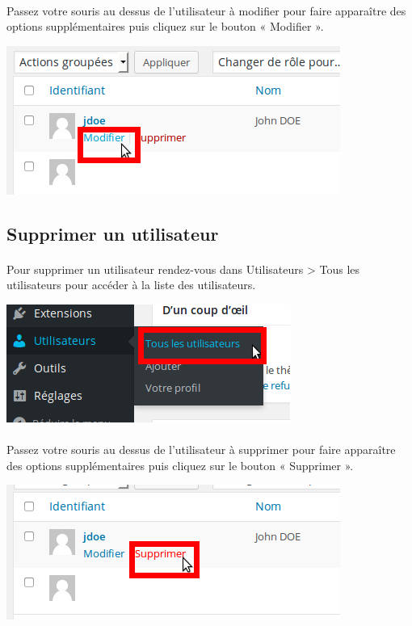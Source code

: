 \documentclass[10pt,a4paper]{article}
\begin{document}
\paragraph{}Passez votre souris au dessus de l'utilisateur à modifier pour faire apparaître des options supplémentaires puis cliquez sur le bouton « Modifier ».
\begin{center}
\includegraphics[scale=0.3]{img/0160.png}
\end{center}
\subsection{Supprimer un utilisateur}
\paragraph{}Pour supprimer un utilisateur rendez-vous dans Utilisateurs > Tous les utilisateurs pour accéder à la liste des utilisateurs.
\begin{center}
\includegraphics[scale=0.3]{img/0159.png}
\end{center}
\paragraph{}Passez votre souris au dessus de l'utilisateur à supprimer pour faire apparaître des options supplémentaires puis cliquez sur le bouton « Supprimer ».
\begin{center}
\includegraphics[scale=0.3]{img/0161.png}
\end{center}
\end{document}
